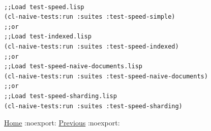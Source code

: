\documentclass[11pt]{article}
\begin{document}
\begin{verbatim}

;;Load test-speed.lisp
(cl-naive-tests:run :suites :test-speed-simple)
;;or
;;Load test-indexed.lisp
(cl-naive-tests:run :suites :test-speed-indexed)
;;or
;;Load test-speed-naive-documents.lisp
(cl-naive-tests:run :suites :test-speed-naive-documents)
;;or
;;Load test-speed-sharding.lisp
(cl-naive-tests:run :suites :test-speed-sharding)

\end{verbatim}

\href{home.org}{Home} :noexport: \href{tests.org}{Previous} :noexport:
\end{document}
